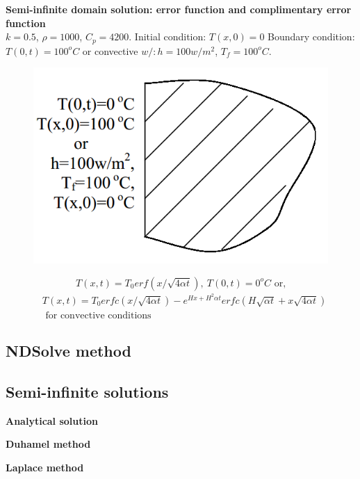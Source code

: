 \begin{appendices}
\begin{example}
\textbf{Semi-infinite domain solution: error function and complimentary error
function}\\
$k = 0.5$, $\rho= 1000$, $C_p = 4200$.
Initial condition: $T(x,0)=0$
Boundary condition: $T(0,t)=100^oC$ or convective $w/:h=100w/m^2$, $T_f=100^oC$.
\begin{figure}[H]
  \centering
    \includegraphics[scale=0.5]{figures/appendixA/9}
\end{figure}
$$T(x,t)=T_0 erf(x/\sqrt{4\alpha t}),~T(0,t)=0^o C\text{ or,}$$
\begin{eqnarray*}
&T(x,t)=T_0 erfc(x/\sqrt{4\alpha t})-e^{Hx+H^2\alpha t}
erfc(H \sqrt{\alpha t}+x\sqrt{4\alpha t})\\
&\text{ for convective conditions}
\end{eqnarray*}
\end{example}

\subsection{NDSolve method}

\subsection{Semi-infinite solutions}
\begin{example}
\textbf{Analytical solution}
\end{example}

\begin{example}
\textbf{Duhamel method}
\end{example}

\begin{example}
\textbf{Laplace method}
\end{example}


\end{appendices}
